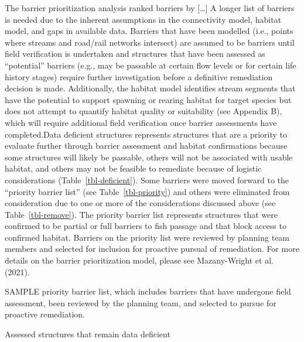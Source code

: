 \documentclass[
  letterpaper,
  DIV=11,
  numbers=noendperiod]{scrreprt}
\begin{document}
The barrier prioritization analysis ranked barriers by {[}\ldots{]} A
longer list of barriers is needed due to the inherent assumptions in the
connectivity model, habitat model, and gaps in available data. Barriers
that have been modelled (i.e., points where streams and road/rail
networks intersect) are assumed to be barriers until field verification
is undertaken and structures that have been assessed as ``potential''
barriers (e.g., may be passable at certain flow levels or for certain
life history stages) require further investigation before a definitive
remediation decision is made. Additionally, the habitat model identifies
stream segments that have the potential to support spawning or rearing
habitat for target species but does not attempt to quantify habitat
quality or suitability (see Appendix B), which will require additional
field verification once barrier assessments have completed.Data
deficient structures represents structures that are a priority to
evaluate further through barrier assessment and habitat confirmations
because some structures will likely be passable, others will not be
associated with usable habitat, and others may not be feasible to
remediate because of logistic considerations
(Table~\ref{tbl-deficient}). Some barriers were moved forward to the
``priority barrier list'' (see Table~\ref{tbl-priority}) and others were
eliminated from consideration due to one or more of the considerations
discussed above (see Table~\ref{tbl-remove}). The priority barrier list
represents structures that were confirmed to be partial or full barriers
to fish passage and that block access to confirmed habitat. Barriers on
the priority list were reviewed by planning team members and selected
for inclusion for proactive pursual of remediation. For more details on
the barrier prioritization model, please see Mazany-Wright et al.
(2021).

\begin{table}

\caption{\label{tbl-priority}SAMPLE priority barrier list, which
includes barriers that have undergone field assessment, been reviewed by
the planning team, and selected to pursue for proactive remediation.}


\end{table}%

\begin{table}

\caption{\label{tbl-deficient}Assessed structures that remain data
deficient}


\end{table}%
\end{document}
